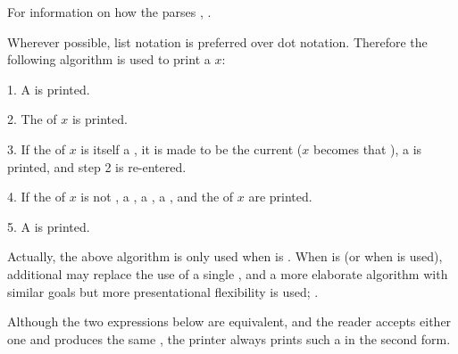 For information on how the  parses ,
\seesection\Doublequote.

\endsubsubsection%

Wherever possible, list notation is preferred over dot notation.  
Therefore the following algorithm is used to print a  $x$:

\goodbreak
\beginlist
\item{1.} A  is printed.

\medbreak
\item{2.} The  of $x$ is printed. 

\medbreak
\item{3.} If the  of $x$ is itself a ,
          it is made to be the current  
	  (\ie $x$ becomes that ), 
	  a 
	  is printed,
          and step 2 is re-entered.

\medbreak
\item{4.} If the  of $x$ is not , 
	  a ,
          a ,
	  a ,
          and the  of $x$ are printed.

\medbreak
\item{5.} A  is printed.
\endlist

Actually, the above algorithm is only used when 
is .  When  is  (or 
when  is used),
additional  
may replace the use of a single ,
and a more elaborate algorithm with similar goals but more presentational 
flexibility is used; \seesection\PrinterDispatch.

Although the two expressions below are equivalent,
and the reader accepts
either one and 
produces
the same , the printer
always prints such a  in the second form.

